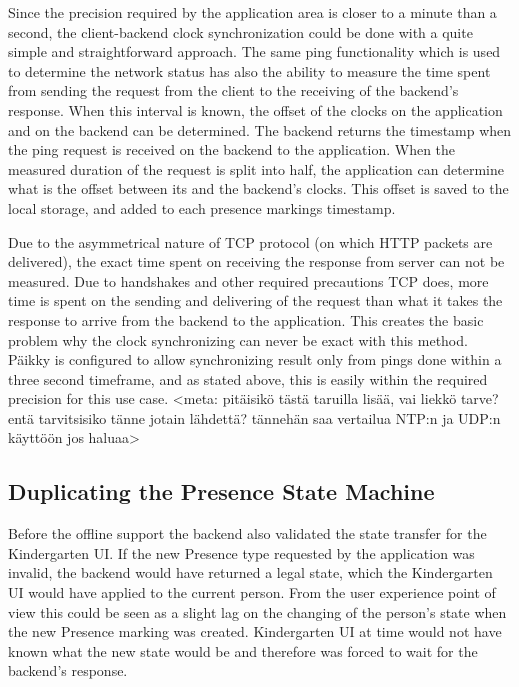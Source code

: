 Since the precision required by the application area is closer to a minute than a second, the client-backend clock synchronization could be done with a quite simple and straightforward approach. The same ping functionality which is used to determine the network status has also the ability to measure the time spent from sending the request from the client to the receiving of the backend's response. When this interval is known, the offset of the clocks on the application and on the backend can be determined. The backend returns the timestamp when the ping request is received on the backend to the application. When the measured duration of the request is split into half, the application can determine what is the offset between its and the backend's clocks. This offset is saved to the local storage, and added to each presence markings timestamp. 


Due to the asymmetrical nature of TCP protocol (on which HTTP packets are delivered), the exact time spent on receiving the response from server can not be measured. Due to handshakes and other required precautions TCP does, more time is spent on the sending and delivering of the request than what it takes the response to arrive from the backend to the application. This creates the basic problem why the clock synchronizing can never be exact with this method. Päikky is configured to allow synchronizing result only from pings done within a three second timeframe, and as stated above, this is easily within the required precision for this use case. <meta: pitäisikö tästä taruilla lisää, vai liekkö tarve? entä tarvitsisiko tänne jotain lähdettä? tännehän saa vertailua NTP:n ja UDP:n käyttöön jos haluaa>






\subsection{Duplicating the Presence State Machine}

Before the offline support the backend also validated the state transfer for the Kindergarten UI. If the new Presence type requested by the application was invalid, the backend would have returned a legal state, which the Kindergarten UI would have applied to the current person. From the user experience point of view this could be seen as a slight lag on the changing of the person's state when the new Presence marking was created. Kindergarten UI at time would not have known what the new state would be and therefore was forced to wait for the backend's response. 

